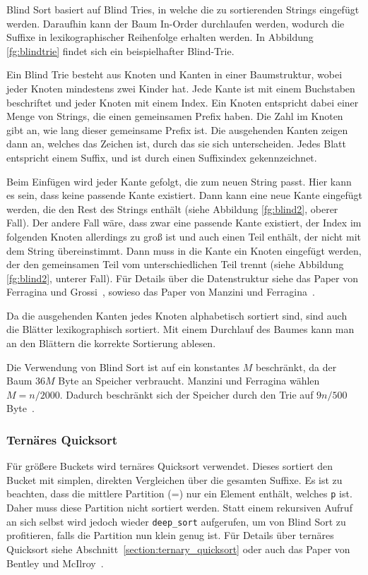 Blind Sort basiert auf Blind Tries, in welche die zu sortierenden Strings eingefügt werden.
Daraufhin kann der Baum In-Order durchlaufen werden, wodurch die Suffixe in lexikographischer Reihenfolge erhalten werden.
In Abbildung \ref{fg:blindtrie} findet sich ein beispielhafter Blind-Trie.

Ein Blind Trie besteht aus Knoten und Kanten in einer Baumstruktur, wobei jeder Knoten mindestens zwei Kinder hat.
Jede Kante ist mit einem Buchstaben beschriftet und jeder Knoten mit einem Index.
Ein Knoten entspricht dabei einer Menge von Strings, die einen gemeinsamen Prefix haben.
Die Zahl im Knoten gibt an, wie lang dieser gemeinsame Prefix ist.
Die ausgehenden Kanten zeigen dann an, welches das Zeichen ist, durch das sie sich unterscheiden.
Jedes Blatt entspricht einem Suffix, und ist durch einen Suffixindex gekennzeichnet.

Beim Einfügen wird jeder Kante gefolgt, die zum neuen String passt.
Hier kann es sein, dass keine passende Kante existiert.
Dann kann eine neue Kante eingefügt werden, die den Rest des Strings enthält (siehe Abbildung \ref{fg:blind2}, oberer Fall).
Der andere Fall wäre, dass zwar eine passende Kante existiert, der Index im folgenden Knoten allerdings zu groß ist und auch einen Teil enthält, der nicht mit dem String übereinstimmt.
Dann muss in die Kante ein Knoten eingefügt werden, der den gemeinsamen Teil vom unterschiedlichen Teil trennt (siehe Abbildung \ref{fg:blind2}, unterer Fall).
Für Details über die Datenstruktur siehe das Paper von Ferragina und Grossi~\cite{ds:blind}, sowieso das Paper von Manzini und Ferragina~\cite{saca:4}.

Da die ausgehenden Kanten jedes Knoten alphabetisch sortiert sind, sind auch die Blätter lexikographisch sortiert.
Mit einem Durchlauf des Baumes kann man an den Blättern die korrekte Sortierung ablesen.

Die Verwendung von Blind Sort ist auf ein konstantes $M$ beschränkt, da der Baum $36 M$ Byte an Speicher verbraucht.
Manzini und Ferragina wählen $M = n / 2000$.
Dadurch beschränkt sich der Speicher durch den Trie auf $9n/500$ Byte~\cite{saca:4}.

\subsubsection{Ternäres Quicksort}
Für größere Buckets wird ternäres Quicksort verwendet.
Dieses sortiert den Bucket mit simplen, direkten Vergleichen über die gesamten Suffixe.
Es ist zu beachten, dass die mittlere Partition (\glqq =\grqq) nur ein Element enthält, welches \texttt{p} ist.
Daher muss diese Partition nicht sortiert werden.
Statt einem rekursiven Aufruf an sich selbst wird jedoch wieder \texttt{deep\_sort} aufgerufen, um von Blind Sort zu profitieren, falls die Partition nun klein genug ist.
Für Details über ternäres Quicksort siehe Abschnitt~\ref{section:ternary_quicksort} oder auch das Paper von Bentley und McIlroy~\cite{ternary_quicksort}.

